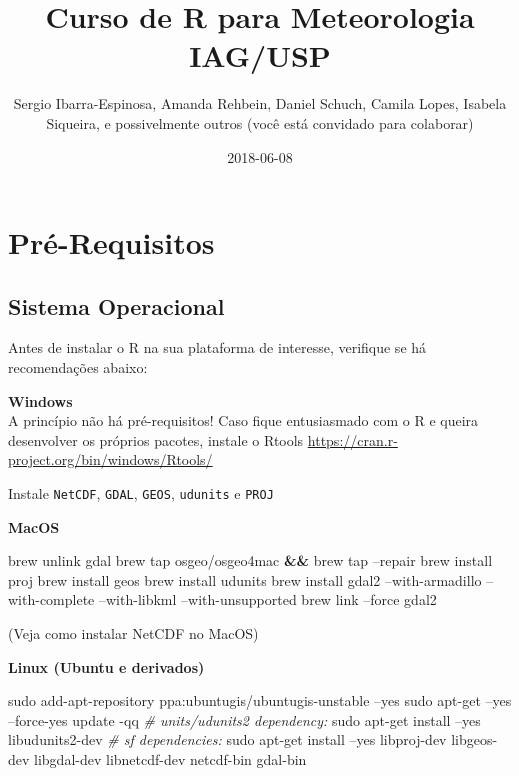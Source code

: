 \documentclass[]{book}
\title{Curso de R para Meteorologia IAG/USP}
\author{Sergio Ibarra-Espinosa, Amanda Rehbein, Daniel Schuch, Camila Lopes,
Isabela Siqueira, e possivelmente outros (você está convidado para
colaborar)}
\date{2018-06-08}
\newenvironment{Shaded}{\begin{snugshade}}{\end{snugshade}}
\newcommand{\KeywordTok}[1]{\textcolor[rgb]{0.13,0.29,0.53}{\textbf{#1}}}
\newcommand{\CommentTok}[1]{\textcolor[rgb]{0.56,0.35,0.01}{\textit{#1}}}
\newcommand{\FunctionTok}[1]{\textcolor[rgb]{0.00,0.00,0.00}{#1}}
\newcommand{\ExtensionTok}[1]{#1}
\newcommand{\NormalTok}[1]{#1}
\theoremstyle{definition}
\theoremstyle{definition}
\theoremstyle{definition}
\theoremstyle{remark}
\begin{document}
\maketitle

{
\setcounter{tocdepth}{1}
\tableofcontents
}
\chapter{Pré-Requisitos}\label{primero}

\section{Sistema Operacional}\label{sistema-operacional}

Antes de instalar o R na sua plataforma de interesse, verifique se há
recomendações abaixo:

\textbf{Windows}\\
A princípio não há pré-requisitos! Caso fique entusiasmado com o R e
queira desenvolver os próprios pacotes, instale o Rtools
\url{https://cran.r-project.org/bin/windows/Rtools/}

Instale \texttt{NetCDF}, \texttt{GDAL}, \texttt{GEOS}, \texttt{udunits}
e \texttt{PROJ}

\textbf{MacOS}

\begin{Shaded}
\begin{Highlighting}[]
\ExtensionTok{brew}\NormalTok{ unlink gdal}
\ExtensionTok{brew}\NormalTok{ tap osgeo/osgeo4mac }\KeywordTok{&&} \ExtensionTok{brew}\NormalTok{ tap --repair}
\ExtensionTok{brew}\NormalTok{ install proj}
\ExtensionTok{brew}\NormalTok{ install geos}
\ExtensionTok{brew}\NormalTok{ install udunits}
\ExtensionTok{brew}\NormalTok{ install gdal2 --with-armadillo --with-complete --with-libkml --with-unsupported}
\ExtensionTok{brew}\NormalTok{ link --force gdal2}
\end{Highlighting}
\end{Shaded}

(Veja como instalar NetCDF no MacOS)

\textbf{Linux (Ubuntu e derivados)}

\begin{Shaded}
\begin{Highlighting}[]
\FunctionTok{sudo}\NormalTok{ add-apt-repository ppa:ubuntugis/ubuntugis-unstable --yes}
\FunctionTok{sudo}\NormalTok{ apt-get --yes --force-yes update -qq}
\CommentTok{# units/udunits2 dependency:}
\FunctionTok{sudo}\NormalTok{ apt-get install --yes libudunits2-dev}
\CommentTok{# sf dependencies:}
\FunctionTok{sudo}\NormalTok{ apt-get install --yes libproj-dev libgeos-dev libgdal-dev libnetcdf-dev  netcdf-bin gdal-bin}
\end{Highlighting}
\end{Shaded}
\end{document}
